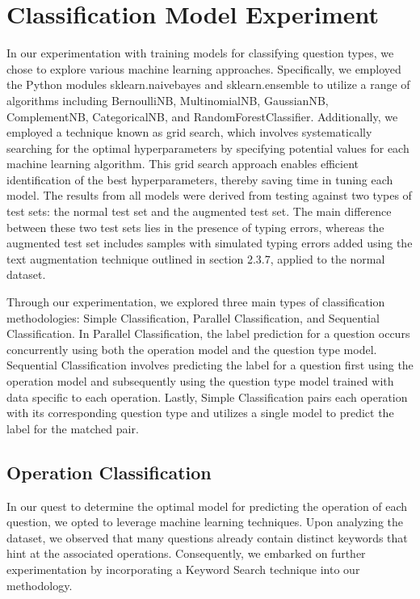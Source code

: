 \documentclass[12pt,oneside,openright,a4paper]{cpe-english-project}
\begin{document}
  \section{Classification Model Experiment}
    \qquad In our experimentation with training models for classifying question types, we chose to explore various machine learning approaches. Specifically, we employed the Python modules sklearn.naivebayes and sklearn.ensemble to utilize a range of algorithms including BernoulliNB, MultinomialNB, GaussianNB, ComplementNB, CategoricalNB, and RandomForestClassifier. Additionally, we employed a technique known as grid search, which involves systematically searching for the optimal hyperparameters by specifying potential values for each machine learning algorithm. This grid search approach enables efficient identification of the best hyperparameters, thereby saving time in tuning each model. The results from all models were derived from testing against two types of test sets: the normal test set and the augmented test set.  The main difference between these two test sets lies in the presence of typing errors, whereas the augmented test set includes samples with simulated typing errors added using the text augmentation technique outlined in section 2.3.7, applied to the normal dataset. \par
    \qquad Through our experimentation, we explored three main types of classification methodologies: Simple Classification, Parallel Classification, and Sequential Classification. In Parallel Classification, the label prediction for a question occurs concurrently using both the operation model and the question type model. Sequential Classification involves predicting the label for a question first using the operation model and subsequently using the question type model trained with data specific to each operation. Lastly, Simple Classification pairs each operation with its corresponding question type and utilizes a single model to predict the label for the matched pair. \par
    \subsection{Operation Classification }
      \qquad In our quest to determine the optimal model for predicting the operation of each question, we opted to leverage machine learning techniques. Upon analyzing the dataset, we observed that many questions already contain distinct keywords that hint at the associated operations. Consequently, we embarked on further experimentation by incorporating a Keyword Search technique into our methodology. \par
\end{document}
